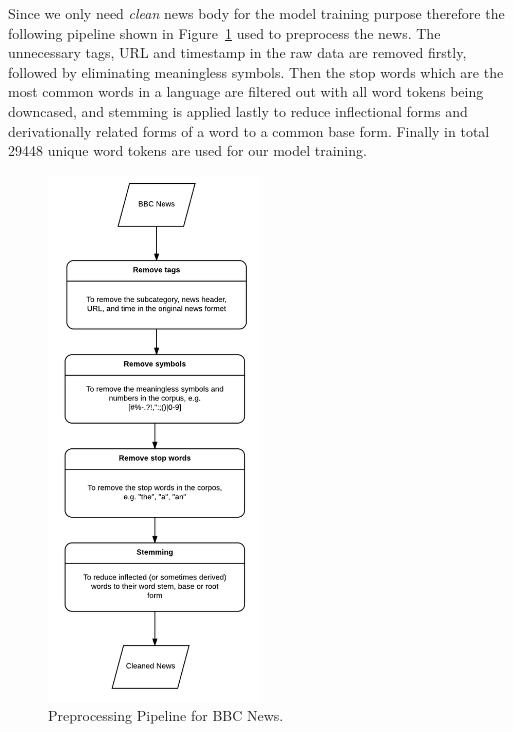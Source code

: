 Since we only need \textit{clean} news body for the model training purpose therefore the following pipeline shown in Figure~\ref{fig:pipeline} used to preprocess the news. The unnecessary tags, URL and timestamp in the raw data are removed firstly, followed by eliminating meaningless symbols. Then the stop words which are the most common words in a language are filtered out with all word tokens being downcased, and stemming is applied lastly to reduce inflectional forms and  derivationally related forms of a word to a common base form. Finally in total 29448 unique word tokens are used for our model training.
\begin{figure}[h]
\centering
\includegraphics[width=0.5\textwidth]{figures/pipeline.png}
\caption{Preprocessing Pipeline for BBC News.}
\label{fig:pipeline}
\end{figure}


